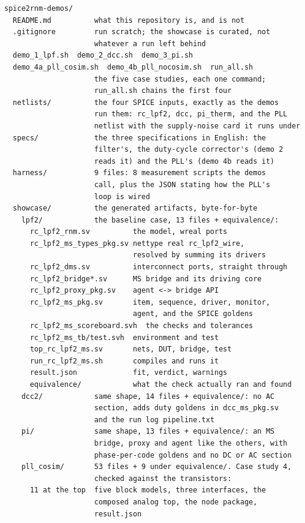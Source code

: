 \documentclass[11pt,a4paper]{article}
\begin{document}
\begin{lstlisting}
spice2rnm-demos/
  README.md          what this repository is, and is not
  .gitignore         run scratch; the showcase is curated, not
                     whatever a run left behind
  demo_1_lpf.sh  demo_2_dcc.sh  demo_3_pi.sh
  demo_4a_pll_cosim.sh  demo_4b_pll_nocosim.sh  run_all.sh
                     the five case studies, each one command;
                     run_all.sh chains the first four
  netlists/          the four SPICE inputs, exactly as the demos
                     run them: rc_lpf2, dcc, pi_therm, and the PLL
                     netlist with the supply-noise card it runs under
  specs/             the three specifications in English: the
                     filter's, the duty-cycle corrector's (demo 2
                     reads it) and the PLL's (demo 4b reads it)
  harness/           9 files: 8 measurement scripts the demos
                     call, plus the JSON stating how the PLL's
                     loop is wired
  showcase/          the generated artifacts, byte-for-byte
    lpf2/            the baseline case, 13 files + equivalence/:
      rc_lpf2_rnm.sv          the model, wreal ports
      rc_lpf2_ms_types_pkg.sv nettype real rc_lpf2_wire,
                              resolved by summing its drivers
      rc_lpf2_dms.sv          interconnect ports, straight through
      rc_lpf2_bridge*.sv      MS bridge and its driving core
      rc_lpf2_proxy_pkg.sv    agent <-> bridge API
      rc_lpf2_ms_pkg.sv       item, sequence, driver, monitor,
                              agent, and the SPICE goldens
      rc_lpf2_ms_scoreboard.svh  the checks and tolerances
      rc_lpf2_ms_tb/test.svh  environment and test
      top_rc_lpf2_ms.sv       nets, DUT, bridge, test
      run_rc_lpf2_ms.sh       compiles and runs it
      result.json             fit, verdict, warnings
      equivalence/            what the check actually ran and found
    dcc2/            same shape, 14 files + equivalence/: no AC
                     section, adds duty goldens in dcc_ms_pkg.sv
                     and the run log pipeline.txt
    pi/              same shape, 13 files + equivalence/: an MS
                     bridge, proxy and agent like the others, with
                     phase-per-code goldens and no DC or AC section
    pll_cosim/       53 files + 9 under equivalence/. Case study 4,
                     checked against the transistors:
      11 at the top  five block models, three interfaces, the
                     composed analog top, the node package,
                     result.json

\end{lstlisting}
\end{document}

